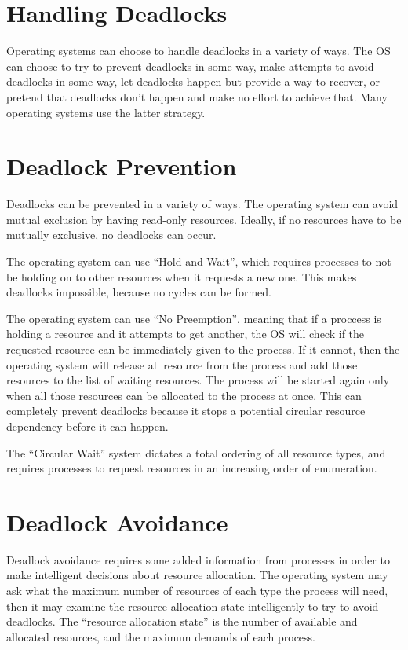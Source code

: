 \documentclass{article}
\begin{document}
\section{Handling Deadlocks}
Operating systems can choose to handle deadlocks in a variety of ways. The OS
can choose to try to prevent deadlocks in some way, make attempts to avoid
deadlocks in some way, let deadlocks happen but provide a way to recover, or
pretend that deadlocks don't happen and make no effort to achieve that. Many
operating systems use the latter strategy.

\section{Deadlock Prevention}
Deadlocks can be prevented in a variety of ways. The operating system can
avoid mutual exclusion by having read-only resources. Ideally, if no resources
have to be mutually exclusive, no deadlocks can occur.

The operating system can use ``Hold and Wait'', which requires processes to
not be holding on to other resources when it requests a new one. This makes
deadlocks impossible, because no cycles can be formed.

The operating system can use ``No Preemption'', meaning that if a proccess is
holding a resource and it attempts to get another, the OS will check if the
requested resource can be immediately given to the process. If it cannot, then
the operating system will release all resource from the process and add those
resources to the list of waiting resources. The process will be started again
only when all those resources can be allocated to the process at once. This can
completely prevent deadlocks because it stops a potential circular resource
dependency before it can happen.

The ``Circular Wait'' system dictates a total ordering of all resource types,
and requires processes to request resources in an increasing order of
enumeration.

\section{Deadlock Avoidance}
Deadlock avoidance requires some added information from processes in order to
make intelligent decisions about resource allocation. The operating system may
ask what the maximum number of resources of each type the process will need,
then it may examine the resource allocation state intelligently to try to avoid
deadlocks. The ``resource allocation state'' is the number of available and
allocated resources, and the maximum demands of each process.
\end{document}
